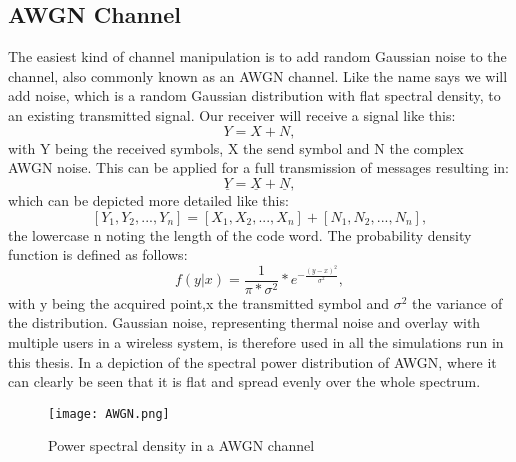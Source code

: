 \subsection{AWGN Channel}
\label{AWGN}

The easiest kind of channel manipulation is to add random Gaussian noise to the channel, also commonly known as an \gls{AWGN} channel. Like the name says we will add noise, which is a random Gaussian distribution with flat spectral density, to an existing transmitted signal. Our receiver will receive a signal like this:
\begin{equation}
\label{eq:1.1}
Y = X + N ,
\end{equation}
with Y being the received symbols, X the send symbol and N the complex AWGN noise. This can be applied for a full transmission of messages resulting in:
\begin{equation}
\label{eq:1.2}
\underline{Y} = \underline{X} + \underline{N},
\end{equation}
which can be depicted more detailed like this:
\begin{equation}
\label{eq:1.3}
[Y_1,Y_2,...,Y_n] = [X_1,X_2,...,X_n] + [N_1,N_2,...,N_n],
\end{equation}
the lowercase n noting the length of the code word.
 The probability density function is defined as follows:
\begin{equation}
\label{eq:AWGNpdf}
f(y|x) = \frac{1}{\pi*\sigma^2}*e^{-\frac{(y-x)^2}{\sigma^2}},  
\end{equation}
with y being the acquired point,x the transmitted symbol and $\sigma^2$ the variance of the distribution.
Gaussian noise, representing thermal noise and overlay with multiple users in a wireless system, is therefore used in all the simulations run in this thesis. In  a depiction of the spectral power distribution of \gls{AWGN}, where it can clearly be seen that it is flat and spread evenly over the whole spectrum.
\begin{figure}[!htb]
	\centering
	\texttt{[image: AWGN.png]}
	\caption{Power spectral density in a AWGN channel}
	\label{fig:AWGNSP}
\end{figure}
\newpage
